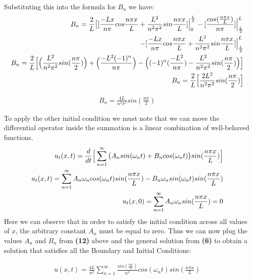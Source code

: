 \documentclass{article}
\begin{document}
Substituting this into the formula for $B_n$ we have:
\begin{equation}
\begin{aligned}
B_n = \frac{2}{L}\big{[}[ \frac{-Lx}{n\pi}cos\frac{n\pi x}{L} + \frac{L^2}{n^2\pi^2}sin\frac{n\pi x}{L}]\Big{|}^{\frac{L}{2}}_0 -[\frac{cos(\frac{n\pi x}{L})}{n\pi}]\Big{|}^L_{\frac{L}{2}}\\
-[\frac{-Lx}{n\pi}cos\frac{n\pi x}{L} + \frac{L^2}{n^2\pi^2}sin\frac{n\pi x}{L}]\Big{|}^L_{\frac{L}{2}}\\
B_n = \frac{2}{L}\Big{[}\Big{(}\frac{L^2}{n^2\pi^2}sin(\frac{n\pi}{2})\Big{)} + \Big{(}\frac{-L^2(-1)^n}{n\pi}\Big{)} - \Big{(}(-1)^n(\frac{-L^2}{n\pi}) - \frac{L^2}{n^2\pi^2}sin(\frac{n\pi}{2})\Big{)}\Big{]}\\
B_n = \frac{2}{L}\Big{[}\frac{2L^2}{n^2\pi^2}sin(\frac{n\pi}{2})\Big{]}
\end{aligned}
\end{equation}
\begin{tcolorbox}[minipage,colback=white,arc=0pt,outer arc=0pt]
\begin{equation}
\begin{aligned}
B_n = \frac{4L}{n^2\pi^2}sin(\frac{n\pi}{2})
\end{aligned}
\end{equation}
\end{tcolorbox}
To apply the other initial condition we must note that we can move the differential operator inside the summation is a linear combination of well-behaved functions.
\begin{equation}
\begin{aligned}
u_t(x,t)= \frac{d}{dt}\Big{[}\sum^{\infty}_{n=1}\big{(}A_nsin(\omega_n t) + B_ncos(\omega_n t)\big{)}sin(\frac{n\pi x}{L})\Big{]}\\
u_t(x,t) = \sum^{\infty}_{n=1}A_n\omega_ncos(\omega_n t)sin(\frac{n\pi x}{L}) - B_n\omega_nsin(\omega_n t)sin(\frac{n\pi x}{L})\\
u_t(x,0) = \sum^{\infty}_{n=1}A_n\omega_nsin(\frac{n\pi x}{L})=0
\end{aligned}
\end{equation}
Here we can observe that in order to satisfy the initial condition across all values of $x$, the arbitrary constant $A_n$ must be equal to zero. Thus we can now plug the values $A_n$ and $B_n$ from \textbf{(12)} above and the general solution from \textbf{(6)} to obtain a solution that satisfies all the Boundary and Initial Conditions:
\begin{tcolorbox}[minipage,colback=white,arc=0pt,outer arc=0pt]
\begin{equation}
\begin{aligned}
u(x,t) = \frac{4L}{\pi^2}\sum^{\infty}_{n=1}\frac{sin(\frac{n\pi}{2})}{n^2}cos(\omega_n t)sin(\frac{n\pi x}{L})
\end{aligned}
\end{equation}
\end{tcolorbox}
\end{document}
